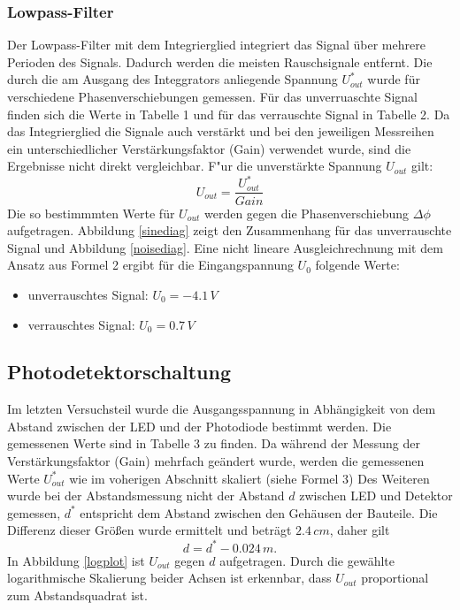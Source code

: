 \documentclass[11pt]{article}
\begin{document}
\subsubsection{Lowpass-Filter}

Der Lowpass-Filter mit dem Integrierglied integriert das Signal über mehrere Perioden des Signals. Dadurch werden die meisten Rauschsignale entfernt. Die durch die am Ausgang des Integgrators anliegende Spannung $U_{out}^*$ wurde f\"ur verschiedene Phasenverschiebungen gemessen. F\"ur das unverruaschte Signal finden sich die Werte in Tabelle 1 und f\"ur das verrauschte Signal in Tabelle 2. Da das Integrierglied die Signale auch verst\"arkt und bei den jeweiligen Messreihen ein unterschiedlicher Verst\"arkungsfaktor (Gain) verwendet wurde, sind die Ergebnisse nicht direkt vergleichbar. F"ur die unverst\"arkte Spannung $U_{out}$ gilt:
\begin{equation}
U_{out} = \frac{U_{out}^*}{Gain}
\end{equation}
Die so bestimmmten Werte f\"ur $U_{out}$ werden gegen die Phasenverschiebung $\Delta \phi$ aufgetragen. Abbildung \ref{sinediag} zeigt den Zusammenhang f\"ur das unverrauschte Signal und Abbildung \ref{noisediag}. Eine nicht lineare Ausgleichrechnung mit dem Ansatz aus Formel 2 ergibt f\"ur die Eingangspannung $U_0$ folgende Werte:
\begin{itemize}
\item unverrauschtes Signal: $U_0=-4.1\,V$
\item verrauschtes Signal: $U_0=0.7\,V$
\end{itemize} 



\subsection{Photodetektorschaltung}
Im letzten Versuchsteil wurde die Ausgangsspannung in Abhängigkeit von dem Abstand zwischen der LED und der Photodiode bestimmt werden. Die gemessenen Werte sind in Tabelle 3 zu finden. Da während der Messung der Verstärkungsfaktor (Gain) mehrfach geändert wurde, werden die gemessenen Werte $U_{out}^*$ wie im voherigen Abschnitt skaliert (siehe Formel 3)
Des Weiteren wurde bei der Abstandsmessung nicht der Abstand $d$ zwischen LED und Detektor gemessen, $d^*$ entspricht dem Abstand zwischen den Gehäusen der Bauteile. Die Differenz dieser Größen wurde ermittelt und beträgt $2.4 \,cm$, daher gilt 
\begin{equation}
d = d^* - 0.024\,m .
\end{equation}
In  Abbildung \ref{logplot} ist $U_{out}$ gegen $d$ aufgetragen. Durch die gewählte logarithmische Skalierung beider Achsen ist erkennbar, dass $U_{out}$ proportional zum Abstandsquadrat ist.
\end{document}
